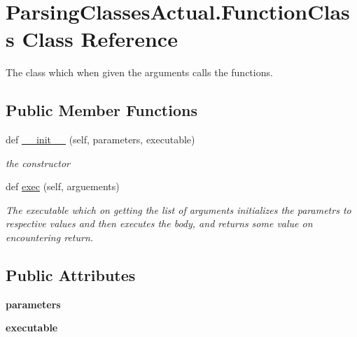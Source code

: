 \hypertarget{class_parsing_classes_actual_1_1_function_class}{}\section{Parsing\+Classes\+Actual.\+Function\+Class Class Reference}
\label{class_parsing_classes_actual_1_1_function_class}


The class which when given the arguments calls the functions.  


\subsection*{Public Member Functions}
\begin{DoxyCompactItemize}
\item 
def \hyperlink{class_parsing_classes_actual_1_1_function_class_a4e12c7299b05b08c94ab18a69bf06c37}{\+\_\+\+\_\+init\+\_\+\+\_\+} (self, parameters, executable)
\begin{DoxyCompactList}\small\item\em the constructor \end{DoxyCompactList}\item 
def \hyperlink{class_parsing_classes_actual_1_1_function_class_a575c7098fc5b04f2df2791a137f596c4}{exec} (self, arguements)
\begin{DoxyCompactList}\small\item\em The executable which on getting the list of arguments initializes the parametrs to respective values and then executes the body, and returns some value on encountering return. \end{DoxyCompactList}\end{DoxyCompactItemize}
\subsection*{Public Attributes}
\begin{DoxyCompactItemize}
\item 
\mbox{\label{class_parsing_classes_actual_1_1_function_class_a0b2facf5cf3be8053e031a6e157dd3a0}} 
{\bfseries parameters}
\item 
\mbox{\label{class_parsing_classes_actual_1_1_function_class_ad575e3f6477182c328f58f2f58c4e388}} 
{\bfseries executable}
\end{DoxyCompactItemize}



